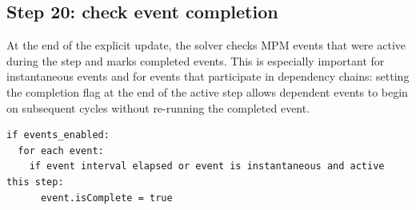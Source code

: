 \subsection{Step 20: check event completion}
\label{subsec:solver-step-20}
At the end of the explicit update, the solver checks MPM events that were active during the step and marks completed events.  This is especially important for instantaneous events and for events that participate in dependency chains: setting the completion flag at the end of the active step allows dependent events to begin on subsequent cycles without re-running the completed event.

\begin{lstlisting}[caption={Event-completion update.},basicstyle=\ttfamily\small]
if events_enabled:
  for each event:
    if event interval elapsed or event is instantaneous and active this step:
      event.isComplete = true
\end{lstlisting}

